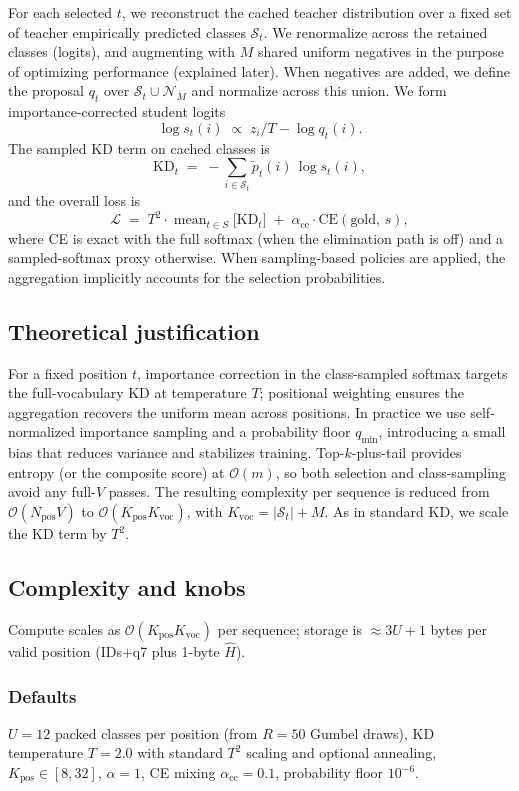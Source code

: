 \documentclass[11pt]{article}
\begin{document}
For each selected $t$, we reconstruct the cached teacher distribution over a fixed set of teacher empirically predicted classes $\mathcal{S}_t$.
We renormalize across the retained classes (logits), and augmenting with $M$ shared uniform negatives in the purpose of optimizing performance (explained later).
When negatives are added, we define the proposal \(q_t\) over \(\mathcal{S}_t \cup \mathcal{N}_M\) and normalize across this union.
We form importance-corrected student logits
\[
\log s_t(i)\;\propto\; z_i/T - \log q_t(i).
\]
The sampled KD term on cached classes is
\[
\mathrm{KD}_t \;=\; -\!\sum_{i\in\mathcal{S}_t} \tilde p_t(i)\,\log s_t(i),
\]
and the overall loss is
\[
\mathcal{L}
\;=\;
T^2\cdot \operatorname{mean}_{t\in S}\!\big[\mathrm{KD}_t\big]
\;+\;
\alpha_{\text{ce}}\cdot \text{CE}(\text{gold},\, s),
\]
where CE is exact with the full softmax (when the elimination path is off) and a sampled-softmax proxy otherwise. When sampling-based policies are applied, the aggregation implicitly accounts for the selection probabilities.


\subsection{Theoretical justification}
For a fixed position $t$, importance correction in the class-sampled softmax targets the full-vocabulary KD at temperature $T$; positional weighting ensures the aggregation recovers the uniform mean across positions. In practice we use self-normalized importance sampling and a probability floor $q_{\min}$, introducing a small bias that reduces variance and stabilizes training. Top-$k$-plus-tail provides entropy (or the composite score) at $\mathcal{O}(m)$, so both selection and class-sampling avoid any full-$V$ passes. The resulting complexity per sequence is reduced from $\mathcal{O}(N_{\text{pos}}V)$ to $\mathcal{O}(K_{\text{pos}}K_{\text{voc}})$, with $K_{\text{voc}}=|\mathcal{S}_t|{+}M$. As in standard KD, we scale the KD term by $T^2$.


\subsection{Complexity and knobs}
Compute scales as $\mathcal{O}(K_{\text{pos}}K_{\text{voc}})$ per sequence; storage is $\approx 3U + 1$ bytes per valid position (IDs+q7 plus 1-byte $\hat H$).

\subsubsection{Defaults} $U{=}12$ packed classes per position (from $R{=}50$ Gumbel draws), KD temperature $T{=}2.0$ with standard $T^2$ scaling and optional annealing, $K_{\text{pos}}\!\in\![8,32]$, $\alpha{=}1$, CE mixing $\alpha_{\text{ce}}{=}0.1$, probability floor $10^{-6}$.
\end{document}
